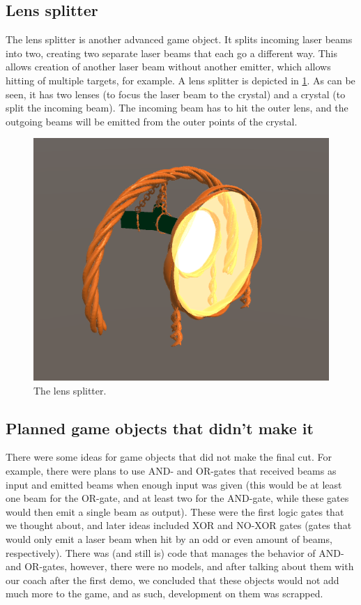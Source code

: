 		\subsection{Lens splitter} \label{ssec:splitter}
			The lens splitter is another advanced game object. It splits incoming
			laser beams into two, creating two separate laser beams that each go
			a different way. This allows creation of another laser beam without
			another emitter, which allows hitting of multiple targets, for
			example. A lens splitter is depicted in \ref{fig:lenssplitter}. As
			can be seen, it has two lenses (to focus the laser beam to the crystal)
			and a crystal (to split the incoming beam). The incoming beam has to hit
			the outer lens, and the outgoing beams will be emitted from the outer
			points of the crystal.
			\begin{figure}[!ht]
				\centering
				\includegraphics[scale = 0.3]{LensSplitter}
				\caption{The lens splitter.}
				\label{fig:lenssplitter}
			\end{figure}
			
		\subsection{Planned game objects that didn't make it} \label{ssec:planned}
			There were some ideas for game objects that did not make the
			final cut. For example, there were plans to use AND- and OR-gates
			that received beams as input and emitted beams when enough input
			was given (this would be at least one beam for the OR-gate, and
			at least two for the AND-gate, while these gates would then emit
			a single beam as output). These were the first logic gates that
			we thought about, and later ideas included XOR and NO-XOR gates
			(gates that would only emit a laser beam when hit by an odd or 
			even amount of beams, respectively). There was (and still is) 
			code that manages the behavior of AND- and OR-gates, however, 
			there were no models, and after talking
			about them with our coach after the first demo, we concluded that
			these objects would not add much more to the game, and as such,
			development on them was scrapped.
			

